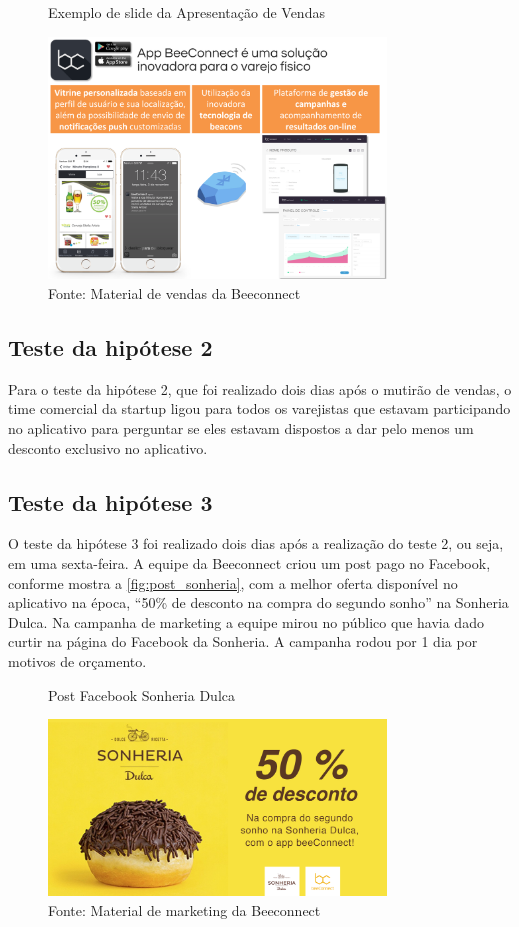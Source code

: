 \begin{figure}[H]
\caption{Exemplo de slide da Apresentação de Vendas}
\centerline{\includegraphics[width=0.8\textwidth]{img/apresentacao_vendas_bc}}
\label{fig:apresentacao_vendas_bc}
\caption* {Fonte: Material de vendas da Beeconnect}
\end{figure}

\subsection{Teste da hipótese 2}
\label{cha:teste_2}
Para o teste da hipótese 2, que foi realizado dois dias após o mutirão de vendas, o time comercial da startup ligou para todos os varejistas que estavam participando no aplicativo para perguntar se eles estavam dispostos a dar pelo menos um desconto exclusivo no aplicativo.

\subsection{Teste da hipótese 3}
\label{cha:teste_3}
O teste da hipótese 3 foi realizado dois dias após a realização do teste 2, ou seja, em uma sexta-feira. A equipe da Beeconnect criou um post pago no Facebook, conforme mostra a \autoref{fig:post_sonheria}, com a melhor oferta disponível no aplicativo na época, \enquote{50\% de desconto na compra do segundo sonho} na Sonheria Dulca. Na campanha de marketing a equipe mirou no público que havia dado curtir na página do Facebook da Sonheria. A campanha rodou por 1 dia por motivos de orçamento.

\begin{figure}[H]
\caption{Post Facebook Sonheria Dulca}
\centerline{\includegraphics[width=0.8\textwidth]{img/post_sonheria}}
\label{fig:post_sonheria}
\caption* {Fonte: Material de marketing da Beeconnect}
\end{figure}

